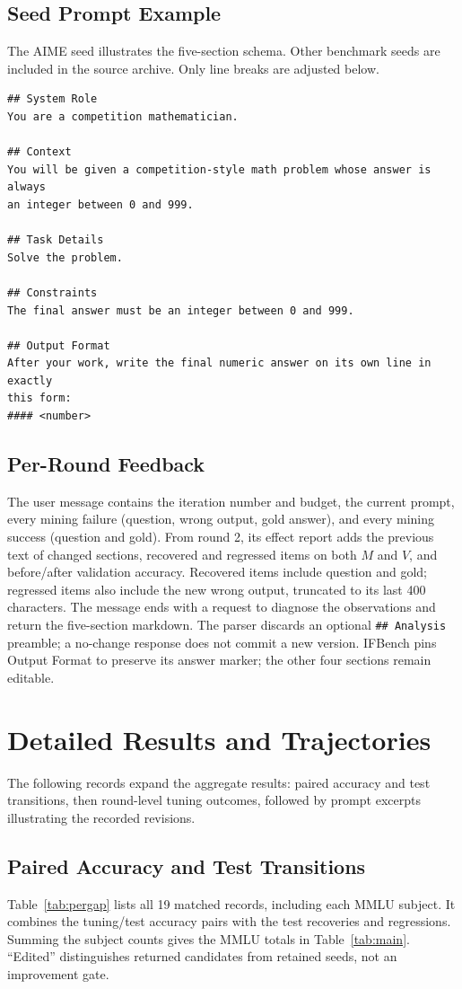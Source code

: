 \documentclass[11pt]{article}
\begin{document}
\subsection{Seed Prompt Example}
\label{app:seed}
The AIME seed illustrates the five-section schema. Other benchmark seeds are included in the source archive.
Only line breaks are adjusted below.
{\small
\begin{verbatim}
## System Role
You are a competition mathematician.

## Context
You will be given a competition-style math problem whose answer is always
an integer between 0 and 999.

## Task Details
Solve the problem.

## Constraints
The final answer must be an integer between 0 and 999.

## Output Format
After your work, write the final numeric answer on its own line in exactly
this form:
#### <number>
\end{verbatim}
}

\subsection{Per-Round Feedback}
\label{app:feedback}
The user message contains the iteration number and budget, the current prompt, every mining failure (question, wrong
output, gold answer), and every mining success (question and gold). From round 2, its effect report adds the previous
text of changed sections, recovered and regressed items on both $M$ and $V$, and before/after validation accuracy.
Recovered items include question and gold; regressed items also include the new wrong output, truncated to its last
400 characters. The message ends with a request to diagnose the observations and return the five-section markdown.
The parser discards an optional \texttt{\#\# Analysis} preamble; a no-change response does not commit a new version.
IFBench pins Output Format to preserve its answer marker; the other four sections remain editable.

\FloatBarrier
\section{Detailed Results and Trajectories}
\label{app:results}
The following records expand the aggregate results: paired accuracy and test transitions, then round-level tuning
outcomes, followed by prompt excerpts illustrating the recorded revisions.

\subsection{Paired Accuracy and Test Transitions}
\label{app:gap}
Table~\ref{tab:pergap} lists all 19 matched records, including each MMLU subject. It combines the tuning/test
accuracy pairs with the test recoveries and regressions. Summing the subject counts gives the MMLU totals in
Table~\ref{tab:main}. ``Edited'' distinguishes returned candidates from retained seeds, not an improvement gate.
\end{document}
